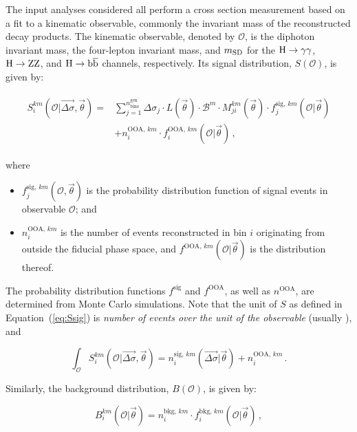 The input analyses considered all perform a cross section measurement based on a fit to a kinematic observable, commonly the invariant mass of the reconstructed decay products.
% 
The kinematic observable, denoted by $\mathcal{O}$, is the diphoton invariant mass, the four-lepton invariant mass, and $m_\mathrm{SD}$ for the $\mathrm{H}\to\mathrm{\gamma}\mathrm{\gamma}$, $\mathrm{H}\to\mathrm{Z}\mathrm{Z}$, and $\mathrm{H}\to\mathrm{b}\overline{\mathrm{b}}$ channels, respectively.
% 
Its signal distribution, $S(\mathcal{O})$, is given by:
% 
\begin{linenomath*}
\begin{align}
\begin{split}
S^{km}_{i}( \mathcal{O} | \vec{\Delta\sigma}, \vec{\theta})
= &
    \sum_{j=1}^{n_\text{bins}^\text{gen}}
        \Delta\sigma_j \cdot L(\vec{\theta}) \cdot \mathcal{B}^{m}
        \cdot M_{ji}^{km}(\vec{\theta})
        \cdot f_{j}^{\text{sig},\,km}( \mathcal{O} | \vec{\theta} )
    \\ &
    + n^{\text{OOA},\,km}_i
        \cdot f^{\text{OOA},\,km}_i( \mathcal{O} | \vec{\theta} )
\,,
%
\label{eq:Ssig}
\end{split}
\end{align}
\end{linenomath*}
% 
where
% 
\begin{itemize}
% 
\item $f_{j}^{\text{sig},\,km}(\mathcal{O},\vec{\theta})$ is the probability distribution function of signal events in observable $\mathcal{O}$; and
% 
\item $n^{\text{OOA},\,km}_i$ is the number of events reconstructed in bin $i$ originating from outside the fiducial phase space, and $f^{\text{OOA},\,km}( \mathcal{O} | \vec{\theta} )$ is the distribution thereof.
% 
\end{itemize}
% 
The probability distribution functions $f^\text{sig}$ and $f^\text{OOA}$, as well as $n^\text{OOA}$, are determined from Monte Carlo simulations.
% 
Note that the unit of $S$ as defined in Equation~(\ref{eq:Ssig}) is \textit{number of events over the unit of the observable} (usually \GeV), and
% 
\begin{linenomath*}
\begin{equation}
\int_\mathcal{O} S_i^{km}( \mathcal{O} | \vec{\Delta\sigma}, \vec{\theta})
    = n_i^{\text{sig},\,km}(\vec{\Delta\sigma} | \vec{\theta})
      + n^{\text{OOA},\,km}_i
\,.
\end{equation}
\end{linenomath*}
% 
Similarly, the background distribution, $B(\mathcal{O})$, is given by:
% 
\begin{linenomath*}
\begin{equation}
B^{km}_i(\mathcal{O}|\vec{\theta})
= n^{\text{bkg},\,km}_i
    \cdot f^{\text{bkg},\,km}_i(\mathcal{O}|\vec{\theta})
\,,
\end{equation}
\end{linenomath*}
